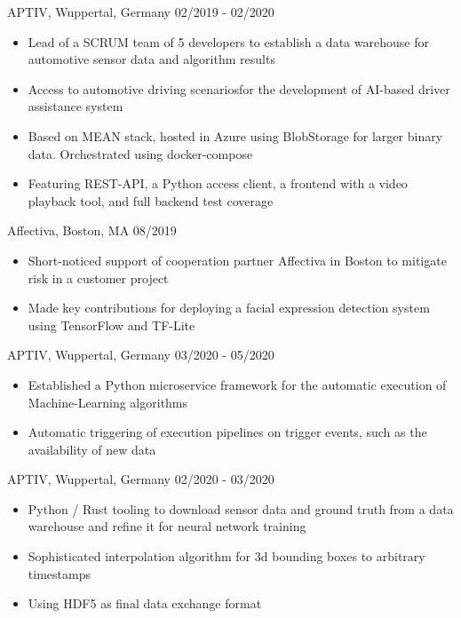 \documentclass[singlesided,
               paper=a4,
               fontsize=10pt
              ]{my-resume}
\begin{document}
    {APTIV, Wuppertal, Germany}
    {02/2019 - 02/2020}
    {\begin{itemize}
        \item Lead of a SCRUM team of 5 developers to establish a data warehouse for automotive sensor data and algorithm results
        \item Access to automotive driving scenariosfor the development of AI-based driver assistance system 
        \item Based on MEAN stack, hosted in Azure using BlobStorage for larger binary data. Orchestrated using docker-compose
        \item Featuring REST-API, a Python access client, a frontend with a video playback tool, and full backend test coverage
    \end{itemize}}
    {Affectiva, Boston, MA}
    {08/2019}
    {\begin{itemize}
        \item Short-noticed support of cooperation partner Affectiva in Boston to mitigate risk in a customer project
        \item Made key contributions for deploying a facial expression detection system using TensorFlow and TF-Lite
    \end{itemize}}
    {APTIV, Wuppertal, Germany}
    {03/2020 - 05/2020}
    {\begin{itemize}
        \item Established a Python microservice framework for the automatic execution of Machine-Learning algorithms
        \item Automatic triggering of execution pipelines on trigger events, such as the availability of new data
    \end{itemize}}
    {APTIV, Wuppertal, Germany}
    {02/2020 - 03/2020}
    {\begin{itemize}
        \item Python / Rust tooling to download sensor data and ground truth from a data warehouse and refine it for neural network training
        \item Sophisticated interpolation algorithm for 3d bounding boxes to arbitrary timestamps
        \item Using HDF5 as final data exchange format
    \end{itemize}}
\end{document}
